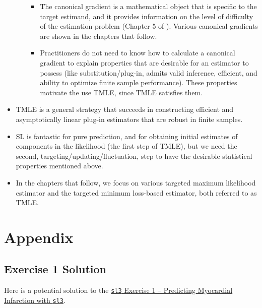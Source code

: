 \documentclass[
  12pt, krantz2,
]{krantz}
\newcommand{\passthrough}[1]{#1}
\providecommand{\tightlist}{%
  \setlength{\itemsep}{0pt}\setlength{\parskip}{0pt}}
\newcommand{\1}{\mathbbm{1}}
\theoremstyle{definition}
\theoremstyle{definition}
\theoremstyle{definition}
\theoremstyle{definition}
\theoremstyle{remark}
\begin{document}
\begin{itemize}
\begin{itemize}
    \begin{itemize}
    \tightlist
    \item
      The canonical gradient is a mathematical object that is specific to
      the target estimand, and it provides information on the level of
      difficulty of the estimation problem (Chapter 5 of \citet{vdl2011targeted}).
      Various canonical gradients are shown in the chapters that follow.
    \item
      Practitioners do not need to know how to calculate a canonical
      gradient to explain properties that are desirable for an
      estimator to possess (like substitution/plug-in, admits valid inference,
      efficient, and ability to optimize finite sample performance).
      These properties motivate the use TMLE, since TMLE satisfies them.
    \end{itemize}
  \end{itemize}
\item
  TMLE is a general strategy that succeeds in constructing efficient and
  asymptotically linear plug-in estimators that are robust in finite samples.
\item
  SL is fantastic for pure prediction, and for obtaining initial
  estimates of components in the likelihood (the first step of TMLE), but we
  need the second, targeting/updating/fluctuation, step to have the desirable
  statistical properties mentioned above.
\item
  In the chapters that follow, we focus on various targeted maximum likelihood
  estimator and the targeted minimum loss-based estimator, both referred to as
  TMLE.
\end{itemize}

\hypertarget{appendix}{%
\section{Appendix}\label{appendix}}

\hypertarget{sl3ex1-sol}{%
\subsection{Exercise 1 Solution}\label{sl3ex1-sol}}

Here is a potential solution to the \href{https://tlverse.org/tlverse-handbook/sl3.html\#predicting-myocardial-infarction-with-sl3}{\passthrough{\lstinline!sl3!} Exercise 1 -- Predicting Myocardial
Infarction with
\passthrough{\lstinline!sl3!}}.
\end{document}
